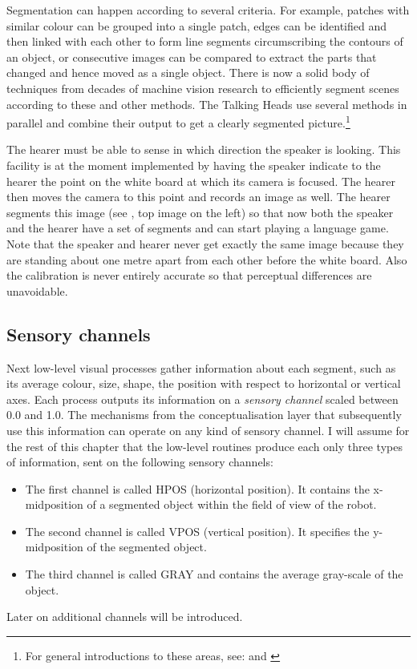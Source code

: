Segmentation can happen according to several criteria. 
For example, patches with similar colour can be grouped 
into a single patch, edges can be identified 
and then linked with each other to form line segments
circumscribing the contours of 
an object, or consecutive images can be compared to extract the parts
that changed and hence moved as a single object. 
There is now a solid body of techniques from decades
of machine vision research to efficiently segment scenes according to 
these and other methods. The Talking Heads use several methods
in parallel and combine their output to get a clearly segmented
picture.\footnote{
For general introductions to these areas, 
see: \cite{Ballard:1982} and \cite{Fischler:1987}}

The hearer must be able to sense in which direction the speaker is looking. 
This facility is at the moment implemented by having 
the speaker indicate to the hearer the point on the white board 
at which its camera is focused. The hearer then moves the camera
to this point and records an image as well. The hearer segments 
this image (see , top image on the left) so that 
now both the speaker 
and the hearer have a set of segments and can start playing 
a language game. Note that the speaker and hearer never get 
exactly the same image because they are standing about one 
metre apart from each other before the white board. Also the
calibration is never entirely accurate so that perceptual 
differences are unavoidable.

\subsection{Sensory channels}

Next low-level visual processes gather information about each 
segment, such as its average colour, size, shape,
the position with respect to horizontal or vertical axes. 
Each process outputs its information on a {\itshape sensory 
channel} scaled between 0.0 and 1.0. The mechanisms from 
the conceptualisation layer that subsequently use this information
can operate on any kind of sensory channel. 
I will assume for the rest of this chapter that the low-level
routines produce each only three types of information, sent
on the following sensory channels: 
\begin{itemize}
\item The first channel is called HPOS (horizontal position). 
It contains the x-midposition of a segmented object within
the field of view of the robot. 
\item The second channel is called VPOS (vertical position). It
specifies the y-midposition of the segmented object. 
\item The third channel is called GRAY and contains 
the average gray-scale of the object. 
\end{itemize}
Later on additional channels will be introduced. 

